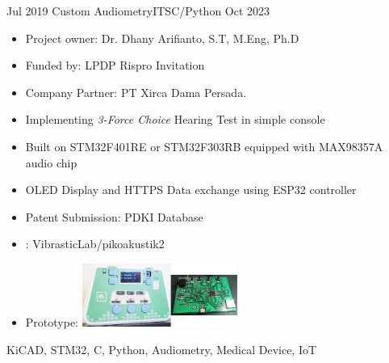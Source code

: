 %
%



\begin{experiences}

    \experience
    {Jul 2019} {Custom Audiometry}{ITS}{C/Python}
	{Oct 2023} {
        \begin{itemize}
            \item Project owner: Dr. Dhany Arifianto, S.T, M.Eng, Ph.D
            \item Funded by: LPDP Rispro Invitation
            \item Company Partner: PT Xirca Dama Persada.
            \item Implementing \textit{3-Force Choice} Hearing Test in simple console
	        \item Built on STM32F401RE or STM32F303RB equipped with MAX98357A audio chip
    	    \item OLED Display and HTTPS Data exchange using ESP32 controller
            \item Patent Submission:  {PDKI Database}
	        \item \faGithub:  {VibrasticLab/pikoakustik2}
            \item Prototype: \includegraphics[width=0.4\textwidth]{images/audiometry_small.jpg}
        \end{itemize}
    }
    {KiCAD, STM32, C, Python, Audiometry, Medical Device, IoT}


\end{experiences}
